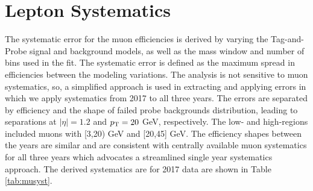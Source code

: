 \section{Lepton Systematics}

The systematic error for the muon efficiencies is derived by varying the Tag-and-Probe signal and background models, as well as the mass window and number of bins used in the fit. The systematic error is defined as the maximum spread in efficiencies between the modeling variations. The analysis is not sensitive to muon systematics, so, a simplified approach is used in extracting and applying errors in which we apply systematics from 2017 to all three years. The errors are separated by efficiency and the shape of failed probe backgrounds distribution, leading to separations at $|\eta|=1.2$ and $p_{\mathrm{T}}=20$ GeV, respectively. The low- and high-\pt regions included muons with [3,20) GeV and [20,45] GeV. The efficiency shapes between the years are similar and are consistent with centrally available muon systematics for all three years which advocates a streamlined single year systematics approach. The derived systematics are for 2017 data are shown in Table \ref{tab:musyst}.

